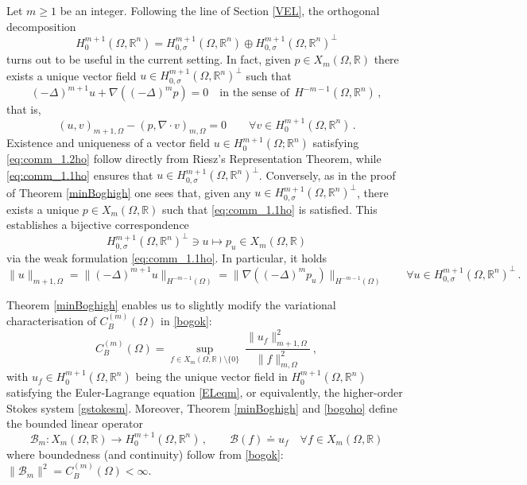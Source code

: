 \documentclass[11pt]{article}
\theoremstyle{plain}
\theoremstyle{definition}
\numberwithin{equation}{section}
\begin{document}
Let $m\ge1$ be an integer. Following the line of Section \ref{VEL}, the orthogonal decomposition
\begin{equation} \label{ortdecho}
	H_{0}^{m+1}(\Omega, \mathbb{R}^{n}) = H_{0, \sigma}^{m+1}(\Omega, \mathbb{R}^{n}) \oplus H_{0, \sigma}^{m+1}(\Omega, \mathbb{R}^{n})^{\perp}
\end{equation}
turns out to be useful in the current setting. In fact, given $p\in X_{m}(\Omega, \mathbb{R})$ there exists a unique vector field $u\in H_{0, \sigma}^{m+1}(\Omega, \mathbb{R}^{n})^{\perp}$ such that
\begin{equation}\label{eq:comm_1.2ho}
	(-\Delta)^{m+1} u + \nabla ((-\Delta)^{m} p) = 0 \quad \text{in the sense of} \ \ H^{-m-1}(\Omega, \mathbb{R}^{n}) \, ,
\end{equation}
that is,
\begin{equation}\label{eq:comm_1.1ho}
	(u,v)_{m+1, \Omega} - (p,\nabla \cdot v)_{m, \Omega} = 0 \qquad \forall v \in H_{0}^{m+1}(\Omega, \mathbb{R}^{n}) \, .
\end{equation}
Existence and uniqueness of a vector field $u \in H_{0}^{m+1}(\Omega; \mathbb{R}^{n})$ satisfying \eqref{eq:comm_1.2ho} follow directly from Riesz's Representation Theorem, while \eqref{eq:comm_1.1ho}
ensures that $u\in H_{0, \sigma}^{m+1}(\Omega, \mathbb{R}^{n})^{\perp}$. Conversely, as in the proof of Theorem \ref{minBoghigh} one sees that, given any
$u\in H_{0, \sigma}^{m+1}(\Omega, \mathbb{R}^{n})^{\perp}$, there exists a unique $p\in X_{m}(\Omega, \mathbb{R})$ such that \eqref{eq:comm_1.1ho} is satisfied. This establishes a bijective correspondence
$$
H_{0, \sigma}^{m+1}(\Omega, \mathbb{R}^{n})^{\perp} \ni u \mapsto p_u\in  X_{m}(\Omega, \mathbb{R})
$$
via the weak formulation \eqref{eq:comm_1.1ho}. In particular, it holds
\begin{equation} \label{equivnormsho}
	\|u\|_{m+1,\Omega} = \|(-\Delta)^{m+1} u\|_{H^{-m-1}(\Omega)} = \|\nabla ((-\Delta)^{m} p_{u})\|_{H^{-m-1}(\Omega)} \qquad \forall u \in H_{0, \sigma}^{m+1}(\Omega, \mathbb{R}^{n})^{\perp} \, .
\end{equation}

Theorem \ref{minBoghigh} enables us to slightly modify the variational characterisation of $C^{(m)}_B(\Omega)$ in \eqref{bogok}:
\begin{equation}\label{bogoho}
	C^{(m)}_{B}(\Omega) = \sup_ {f\in X_{m}(\Omega, \mathbb{R}) \setminus \{0\}} \ \dfrac{\|u_f\|_{m+1,\Omega}^2}{\|f\|_{m,\Omega}^2} \, ,
\end{equation}
with $u_{f} \in H_{0}^{m+1}(\Omega, \mathbb{R}^{n})$ being the unique vector field in $H_{0}^{m+1}(\Omega, \mathbb{R}^{n})$ satisfying the Euler-Lagrange equation \eqref{ELeqm}, or equivalently, the higher-order Stokes system \eqref{gstokesm}. Moreover, Theorem \ref{minBoghigh} and \eqref{bogoho} define the bounded linear operator
$$\mathcal{B}_{m} : X_{m}(\Omega, \mathbb{R}) \longrightarrow H_{0}^{m+1}(\Omega, \mathbb{R}^{n})\, ,\qquad \mathcal{B}(f) \doteq u_{f}\quad\forall f\in X_m(\Omega, \mathbb{R})$$
where boundedness (and continuity) follow from \eqref{bogok}: $\| \mathcal{B}_{m} \|^{2} = C^{(m)}_B(\Omega)<\infty$.
\end{document}
